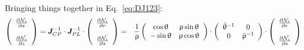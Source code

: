 Bringing things together in Eq.~\eqref{eq:DJ123}:
\begin{eqnarray}
\left(
\begin{array}{c}
\frac{\partial {\mathcal{N}}_i}{\partial x} \\ \\
\frac{\partial {\mathcal{N}}_i}{\partial z} 
\end{array}
\right)
={\bm J}_{CP}^{-1}\cdot {\bm J}_{PL}^{-1}\cdot 
\left(
\begin{array}{c}
\frac{\partial {\mathcal{N}}_i}{\partial r} \\ \\
\frac{\partial {\mathcal{N}}_i}{\partial s} 
\end{array}
\right)  
&=&
\frac{1}{\uprho}
\left(
\begin{array}{cc}
\cos \uptheta & \uprho\sin\uptheta \\ 
-\sin\uptheta & \uprho\cos\uptheta
\end{array}
\right)
\cdot
\left(
\begin{array}{cc}
\tilde{\uptheta}^{-1} & 0 \\
0 &  \bar{\uprho}^{-1}
\end{array}
\right)
\cdot 
\left(
\begin{array}{c}
\frac{\partial {\mathcal{N}}_i}{\partial r} \\ \\
\frac{\partial {\mathcal{N}}_i}{\partial s} 
\end{array}
\right)  
\end{eqnarray}

